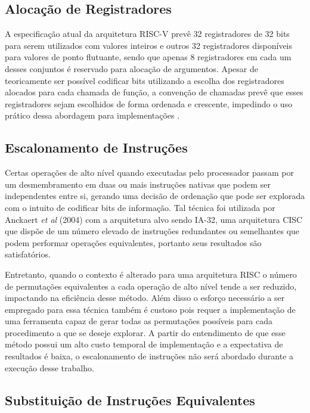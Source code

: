 \subsection{Alocação de Registradores}

A especificação atual da arquitetura RISC-V prevê 32 registradores de 32 bits para serem utilizados com valores inteiros e outros 32 registradores disponíveis para valores de ponto flutuante, sendo que apenas 8 registradores em cada um desses conjuntos é reservado para alocação de argumentos. Apesar de teoricamente ser possível codificar bits utilizando a escolha dos registradores alocados para cada chamada de função, a convenção de chamadas prevê que esses registradores sejam escolhidos de forma ordenada e crescente, impedindo o uso prático dessa abordagem para implementações \cite{riscv_manual_psabi}.

\subsection{Escalonamento de Instruções}

Certas operações de alto nível quando executadas pelo processador passam por um desmembramento em duas ou mais instruções nativas que podem ser independentes entre si, gerando uma decisão de ordenação que pode ser explorada com o intuito de codificar bits de informação. Tal técnica foi utilizada por Anckaert \textit{et al} (2004) com a arquitetura alvo sendo IA-32, uma arquitetura CISC que dispõe de um número elevado de instruções redundantes ou semelhantes que podem performar operações equivalentes, portanto seus resultados são satisfatórios.

Entretanto, quando o contexto é alterado para uma arquitetura RISC o número de permutações equivalentes a  cada operação de alto nível tende a ser reduzido, impactando na eficiência desse método. Além disso o esforço necessário a ser empregado para essa técnica também é custoso pois requer a implementação de uma ferramenta capaz de gerar todas as permutações possíveis para cada procedimento a que se deseje explorar. A partir do entendimento de que esse método possui um alto custo temporal de implementação e a expectativa de resultados é baixa, o escalonamento de instruções não será abordado durante a execução desse trabalho.

\subsection{Substituição de Instruções Equivalentes}

